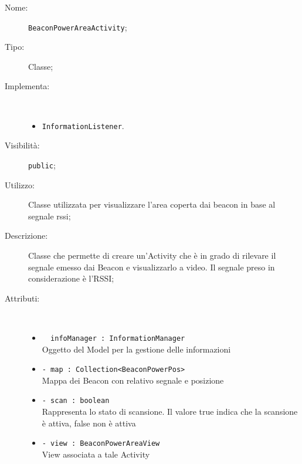 \documentclass[../DefinizioneDiProdotto.tex]{subfiles}
\begin{document}
\begin{description}
	\item[Nome:] \texttt{BeaconPowerAreaActivity};
	\item[Tipo:] Classe;
	\item[Implementa:] \
	\begin{itemize}
		\item \texttt{InformationListener}.
		
	\end{itemize}
	\item[Visibilità:] \texttt{public};
	\item[Utilizzo:] Classe utilizzata per visualizzare l'area coperta dai beacon in base al segnale rssi;
	\item[Descrizione:] Classe che permette di creare un'Activity che è in grado di rilevare il segnale emesso dai Beacon e visualizzarlo a video. Il segnale preso in considerazione è l'RSSI;
	\item[Attributi:] \
	\begin{itemize}
		\item \texttt{~ infoManager : InformationManager}\\
		Oggetto del Model per la gestione delle informazioni
		
		\item \texttt{- map : Collection<BeaconPowerPos>}\\
		Mappa dei Beacon con relativo segnale e posizione
		
		\item \texttt{- scan : boolean}\\
		Rappresenta lo stato di scansione. Il valore true indica che la scansione è attiva, false non è attiva
		
		\item \texttt{- view : BeaconPowerAreaView}\\
		View associata a tale Activity
		

\end{itemize}
\end{description}
\end{document}
